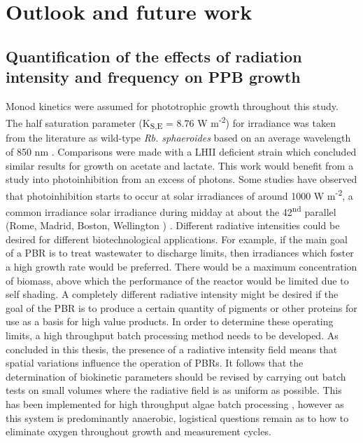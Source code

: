 


\section{Outlook and future work}
\subsection{Quantification of the effects of radiation intensity and frequency on PPB growth}
Monod kinetics were assumed for phototrophic growth throughout this study. The half saturation parameter (K\textsubscript{S,E} = 8.76 W m\textsuperscript{-2}) for irradiance was taken from the literature as wild-type \textit{Rb. sphaeroides} based on an average wavelength of 850 nm \cite{eltsova2016}. Comparisons were made with a LHII deficient strain which concluded similar results for growth on acetate and lactate. This work would benefit from a study into photoinhibition from an excess of photons. Some studies have observed that photoinhibition starts to occur at solar irradiances of around 1000 W m\textsuperscript{-2}, a common irradiance solar irradiance during midday at about the 42\textsuperscript{nd} parallel (Rome, Madrid, Boston, Wellington \etc) \cite{adessi2014a,miyake1999}. 
\skippingparagraph
Different radiative intensities could be desired for different biotechnological applications. For example, if the main goal of a PBR is to treat wastewater to discharge limits, then irradiances which foster a high growth rate would be preferred. There would be a maximum concentration of biomass, above which the performance of the reactor would be limited due to self shading. A completely different radiative intensity might be desired if the goal of the PBR is to produce a certain quantity of pigments or other proteins for use as a basis for high value products.
\skippingparagraph
In order to determine these operating limits, a high throughput batch processing method needs to be developed. As concluded in this thesis, the presence of a radiative intensity field means that spatial variations influence the operation of PBRs. It follows that the determination of biokinetic parameters should be revised by carrying out batch tests on small volumes where the radiative field is as uniform as possible. This has been implemented for high throughput algae batch processing \cite{vanwagenen2014}, however as this system is predominantly anaerobic, logistical questions remain as to how to eliminate oxygen throughout growth and measurement cycles.
